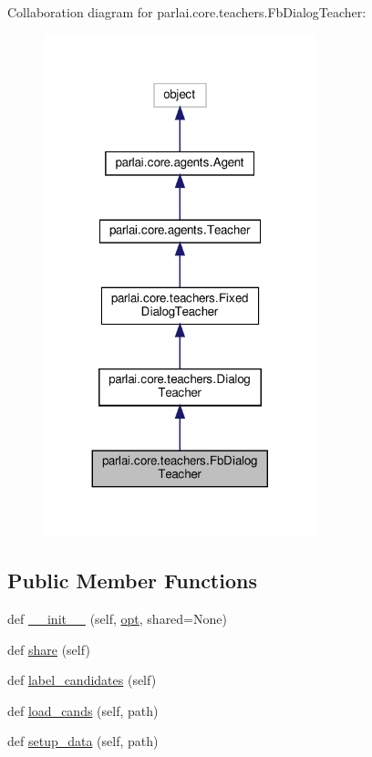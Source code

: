 Collaboration diagram for parlai.\+core.\+teachers.\+Fb\+Dialog\+Teacher\+:
\nopagebreak
\begin{figure}[H]
\begin{center}
\leavevmode
\includegraphics[width=224pt]{classparlai_1_1core_1_1teachers_1_1FbDialogTeacher__coll__graph}
\end{center}
\end{figure}
\subsection*{Public Member Functions}
\begin{DoxyCompactItemize}
\item 
def \hyperlink{classparlai_1_1core_1_1teachers_1_1FbDialogTeacher_a52316baa31ca0881d4cd98ec2fbebad5}{\+\_\+\+\_\+init\+\_\+\+\_\+} (self, \hyperlink{classparlai_1_1core_1_1teachers_1_1FbDialogTeacher_af7a9ec497b9cd0292d7b8fa220da7c28}{opt}, shared=None)
\item 
def \hyperlink{classparlai_1_1core_1_1teachers_1_1FbDialogTeacher_a18a4ea7a7f21eeed7e087cb447a37c5a}{share} (self)
\item 
def \hyperlink{classparlai_1_1core_1_1teachers_1_1FbDialogTeacher_ab3ff2f1a0707aae7bf888fb13ec49641}{label\+\_\+candidates} (self)
\item 
def \hyperlink{classparlai_1_1core_1_1teachers_1_1FbDialogTeacher_ae6f10486ddf691ee868d33ea2c9dc295}{load\+\_\+cands} (self, path)
\item 
def \hyperlink{classparlai_1_1core_1_1teachers_1_1FbDialogTeacher_a6cb23867e396fac5fdcde509b5da3942}{setup\+\_\+data} (self, path)
\end{DoxyCompactItemize}
